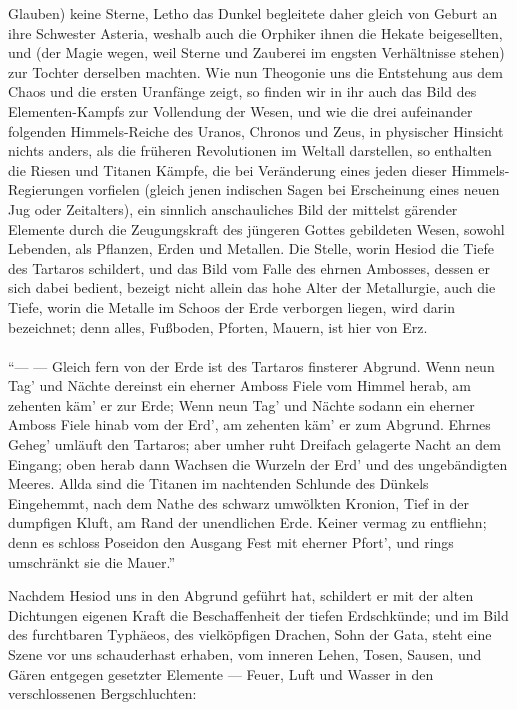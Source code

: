 \documentclass[a4paper, 11pt, oneside, polutonikogreek, german]{article}
\begin{document}
\begin{enumerate}
Glauben) keine Sterne, Letho das Dunkel begleitete daher gleich von Geburt an ihre Schwester Asteria, weshalb auch die Orphiker ihnen die Hekate beigesellten, und (der Magie wegen, weil Sterne und Zauberei im engsten Verhältnisse stehen) zur Tochter derselben machten. Wie nun Theogonie uns die Entstehung aus dem Chaos und die ersten Uranfänge zeigt, so finden wir in ihr auch das Bild des Elementen-Kampfs zur Vollendung der Wesen, und wie die drei aufeinander folgenden Himmels-Reiche des Uranos, Chronos und Zeus, in physischer Hinsicht nichts anders, als die früheren Revolutionen im Weltall darstellen, so enthalten die Riesen und Titanen Kämpfe, die bei Veränderung eines jeden dieser Himmels-Regierungen vorfielen (gleich jenen indischen Sagen bei Erscheinung eines neuen Jug oder Zeitalters), ein sinnlich anschauliches Bild der mittelst gärender Elemente durch die Zeugungskraft des jüngeren Gottes gebildeten Wesen, sowohl Lebenden, als Pflanzen, Erden und Metallen. Die Stelle, worin Hesiod die Tiefe des Tartaros schildert, und das Bild vom Falle des ehrnen Ambosses, dessen er sich dabei bedient, bezeigt nicht allein das hohe Alter der Metallurgie, auch die Tiefe, worin die Metalle im Schoos der Erde verborgen liegen, wird darin bezeichnet; denn alles, Fußboden, Pforten, Mauern, ist hier von Erz.
\end{enumerate}
\paragraph{}
"`--- --- Gleich fern von der Erde ist des Tartaros finsterer Abgrund. Wenn neun Tag' und Nächte dereinst ein eherner Amboss Fiele vom Himmel herab, am zehenten käm' er zur Erde; Wenn neun Tag' und Nächte sodann ein eherner Amboss Fiele hinab vom der Erd', am zehenten käm' er zum Abgrund. Ehrnes Geheg' umläuft den Tartaros; aber umher ruht Dreifach gelagerte Nacht an dem Eingang; oben herab dann Wachsen die Wurzeln der Erd' und des ungebändigten Meeres. Allda sind die Titanen im nachtenden Schlunde des Dünkels Eingehemmt, nach dem Nathe des schwarz umwölkten Kronion, Tief in der dumpfigen Kluft, am Rand der unendlichen Erde. Keiner vermag zu entfliehn; denn es schloss Poseidon den Ausgang Fest mit eherner Pfort', und rings umschränkt sie die Mauer."'

Nachdem Hesiod uns in den Abgrund geführt hat, schildert er mit der alten Dichtungen eigenen Kraft die Beschaffenheit der tiefen Erdschkünde; und im Bild des furchtbaren Typhäeos, des vielköpfigen Drachen, Sohn der Gata, steht eine Szene vor uns schauderhast erhaben, vom inneren Lehen, Tosen, Sausen, und Gären entgegen gesetzter Elemente --- Feuer, Luft und Wasser in den verschlossenen Bergschluchten:
\end{document}

